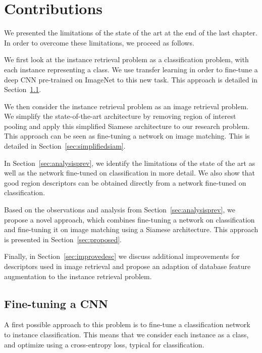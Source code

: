 

\chapter{Contributions}
We presented the limitations of the state of the art at the end of the
last chapter. In order to overcome these limitations, we proceed as
follows.

We first look at the instance retrieval problem as a
classification problem, with each instance representing a class.
We use transfer learning in order to fine-tune
a deep CNN pre-trained on ImageNet to this new task. This approach
is detailed in Section~\ref{sec:finetuning}.

We then consider the instance retrieval problem as an image retrieval
problem. We simplify the state-of-the-art architecture by removing
region of interest pooling and apply this simplified Siamese architecture
to our research problem. This approach can be seen as fine-tuning a network
on image matching. This is detailed in Section~\ref{sec:simplifiedsiam}.

In Section~\ref{sec:analysisprev}, we identify the limitations of the
state of the art as well as the network fine-tuned on classification
in more detail. We also show that good region descriptors can be obtained
directly from a network fine-tuned on classification.

Based on the observations and analysis from Section~\ref{sec:analysisprev},
we propose a novel approach, which combines fine-tuning a network on
classification and fine-tuning it on image matching using a Siamese
architecture. This approach is presented in Section~\ref{sec:proposed}.

Finally, in Section~\ref{sec:improvedesc} we discuss additional
improvements for descriptors used in image retrieval and propose
an adaption of database feature augmentation to the instance retrieval problem.

\section{Fine-tuning a CNN}\label{sec:finetuning}
A first possible approach to this problem is to fine-tune
a classification network to instance classification. This means that
we consider each instance as a class, and optimize using a cross-entropy
loss, typical for classification.

